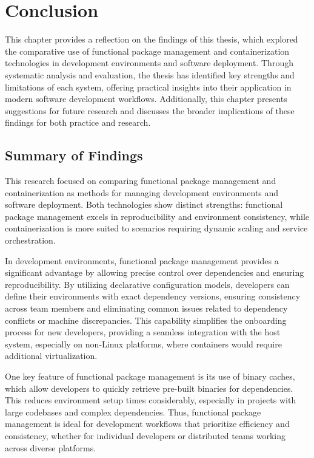 \chapter{Conclusion}
This chapter provides a reflection on the findings of this thesis, which explored the 
comparative use of functional package management and containerization technologies in 
development environments and software deployment. Through systematic analysis and evaluation, 
the thesis has identified key strengths and limitations of each system, offering practical 
insights into their application in modern software development workflows. Additionally, 
this chapter presents suggestions for future research and discusses the broader implications 
of these findings for both practice and research.

\section{Summary of Findings}
This research focused on comparing functional package management and containerization as 
methods for managing development environments and software deployment. Both technologies 
show distinct strengths: functional package management excels in reproducibility and 
environment consistency, while containerization is more suited to scenarios requiring 
dynamic scaling and service orchestration.

In development environments, functional package management provides a significant advantage 
by allowing precise control over dependencies and ensuring reproducibility. By utilizing 
declarative configuration models, developers can define their environments with exact 
dependency versions, ensuring consistency across team members and eliminating common issues 
related to dependency conflicts or machine discrepancies. This capability simplifies the 
onboarding process for new developers, providing a seamless integration with the host system, 
especially on non-Linux platforms, where containers would require additional virtualization.

One key feature of functional package management is its use of binary caches, which allow 
developers to quickly retrieve pre-built binaries for dependencies. This reduces environment 
setup times considerably, especially in projects with large codebases and complex dependencies. 
Thus, functional package management is ideal for development workflows that prioritize 
efficiency and consistency, whether for individual developers or distributed teams working 
across diverse platforms.

